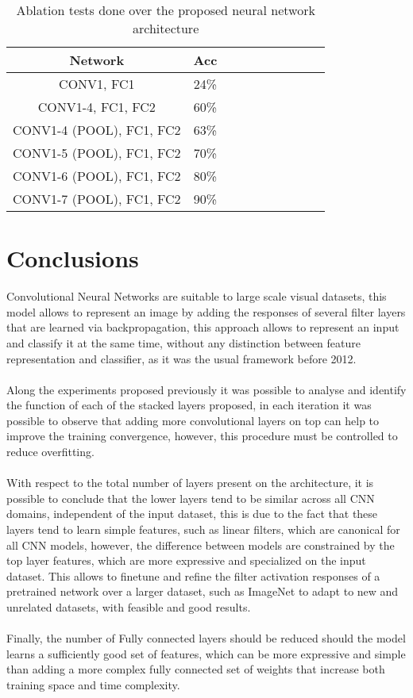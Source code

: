 \documentclass[10pt,twocolumn,letterpaper]{article}
\begin{document}
\begin{table}[H]
	\centering
	\begin{tabular}{|c|c|c|c|c|c|c|c|c|c|}
		\hline
		Network & Acc \\ \hline
		CONV1, FC1 & 24\% \\ \hline
		CONV1-4, FC1, FC2 & 60\% \\ \hline
		CONV1-4 (POOL), FC1, FC2 & 63\% \\ \hline
		CONV1-5 (POOL), FC1, FC2 & 70\% \\ \hline
		CONV1-6 (POOL), FC1, FC2 & 80\% \\ \hline
		CONV1-7 (POOL), FC1, FC2 & 90\% \\ \hline
	\end{tabular}
	\caption{Ablation tests done over the proposed neural network architecture}
	\label{Tab:Ablation}
\end{table}

\section{Conclusions}
Convolutional Neural Networks are suitable to large scale visual datasets, this model allows to represent an image by adding the responses of several filter layers that are learned via backpropagation, this approach allows to represent an input and classify it at the same time, without any distinction between feature representation and classifier, as it was the usual framework before 2012. 
\\
\\
Along the experiments proposed previously it was possible to analyse and identify the function of each of the stacked layers proposed, in each iteration it was possible to observe that adding more convolutional layers on top can help to improve the training convergence, however, this procedure must be controlled to reduce overfitting. 
\\
\\
With respect to the total number of layers present on the architecture, it is possible to conclude that the lower layers tend to be similar across all CNN domains, independent of the input dataset, this is due to the fact that these layers tend to learn simple features, such as linear filters, which are canonical for all CNN models, however, the difference between models are constrained by the top layer features, which are more expressive and specialized on the input dataset. This allows to finetune and refine the filter activation responses of a pretrained network over a larger dataset, such as ImageNet to adapt to new and unrelated datasets, with feasible and good results.
\\
\\
Finally, the number of Fully connected layers should be reduced should the model learns a sufficiently good set of features, which can be more expressive and simple than adding a more complex fully connected set of weights that increase both training space and time complexity.
\end{document}
